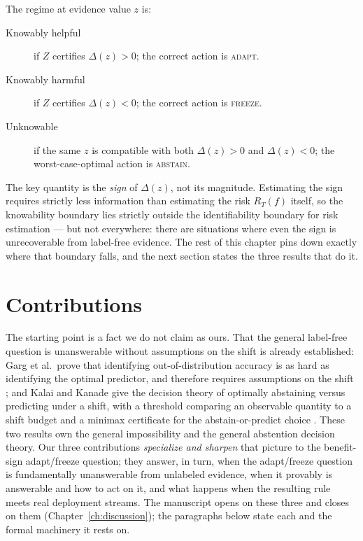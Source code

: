 The regime at evidence value $z$ is:
\begin{description}
\item[Knowably helpful] if $Z$ certifies $\Delta(z) > 0$; the correct
    action is \textsc{adapt}.
\item[Knowably harmful] if $Z$ certifies $\Delta(z) < 0$; the correct
    action is \textsc{freeze}.
\item[Unknowable] if the same $z$ is compatible with both $\Delta(z) > 0$
    and $\Delta(z) < 0$; the worst-case-optimal action is
    \textsc{abstain}.
\end{description}

The key quantity is the \emph{sign} of $\Delta(z)$, not its magnitude.
Estimating the sign requires strictly less information than estimating the
risk $R_T(f)$ itself, so the knowability boundary lies strictly outside the
identifiability boundary for risk estimation --- but not everywhere: there are
situations where even the sign is unrecoverable from label-free evidence. The
rest of this chapter pins down exactly where that boundary falls, and the next
section states the three results that do it.

\section{Contributions}\label{sec:intro-contributions}

The starting point is a fact we do not claim as ours. That the general
label-free question is unanswerable without assumptions on the shift is already
established: Garg et al.\ prove that identifying out-of-distribution accuracy is
as hard as identifying the optimal predictor, and therefore requires assumptions
on the shift \cite{garg2022atc}; and Kalai and Kanade give the decision theory of
optimally abstaining versus predicting under a shift, with a threshold comparing an
observable quantity to a shift budget and a minimax certificate for the
abstain-or-predict choice \cite{kalai2021abstain}. These two results own the
general impossibility and the general abstention decision theory. Our three
contributions \emph{specialize and sharpen} that picture to the benefit-sign
adapt/freeze question; they answer, in turn, when the adapt/freeze question is
fundamentally unanswerable from unlabeled evidence, when it provably is answerable
and how to act on it, and what happens when the resulting rule meets real
deployment streams. The manuscript opens on these three and closes on them
(Chapter~\ref{ch:discussion}); the paragraphs below state each and the formal
machinery it rests on.

